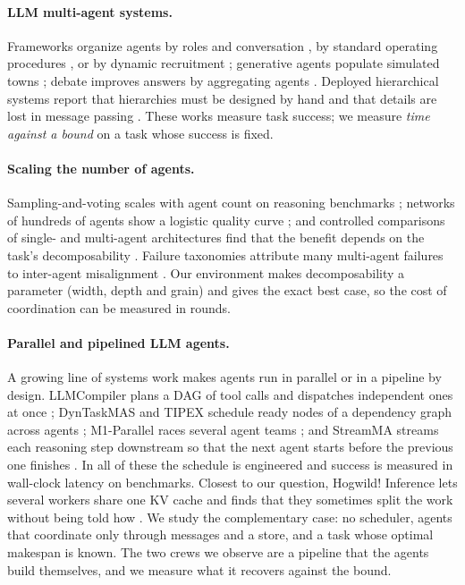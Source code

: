 \documentclass[10pt,twocolumn]{article}
\begin{document}
\paragraph{LLM multi-agent systems.}
Frameworks organize agents by roles and conversation \citep{wu2023autogen,li2023camel}, by standard operating procedures \citep{hong2024metagpt,qian2024chatdev}, or by dynamic recruitment \citep{chen2024agentverse}; generative agents populate simulated towns \citep{park2023generative}; debate improves answers by aggregating agents \citep{du2024debate}.
Deployed hierarchical systems report that hierarchies must be designed by hand and that details are lost in message passing \citep{zou2025elagente}.
These works measure task success; we measure \emph{time against a bound} on a task whose success is fixed.

\paragraph{Scaling the number of agents.}
Sampling-and-voting scales with agent count on reasoning benchmarks \citep{li2024moreagents}; networks of hundreds of agents show a logistic quality curve \citep{qian2025macnet}; and controlled comparisons of single- and multi-agent architectures find that the benefit depends on the task's decomposability \citep{kim2025scaling}.
Failure taxonomies attribute many multi-agent failures to inter-agent misalignment \citep{cemri2025fail}.
Our environment makes decomposability a parameter (width, depth and grain) and gives the exact best case, so the cost of coordination can be measured in rounds.

\paragraph{Parallel and pipelined LLM agents.}
A growing line of systems work makes agents run in parallel or in a pipeline by design. LLMCompiler plans a DAG of tool calls and dispatches independent ones at once \citep{kim2024llmcompiler}; DynTaskMAS and TIPEX schedule ready nodes of a dependency graph across agents \citep{yu2025dyntaskmas,xu2026tipex}; M1-Parallel races several agent teams \citep{zhang2025m1parallel}; and StreamMA streams each reasoning step downstream so that the next agent starts before the previous one finishes \citep{yang2026streamma}. In all of these the schedule is engineered and success is measured in wall-clock latency on benchmarks. Closest to our question, Hogwild! Inference lets several workers share one KV cache and finds that they sometimes split the work without being told how \citep{rodionov2025hogwild}. We study the complementary case: no scheduler, agents that coordinate only through messages and a store, and a task whose optimal makespan is known. The two crews we observe are a pipeline that the agents build themselves, and we measure what it recovers against the bound.
\end{document}
